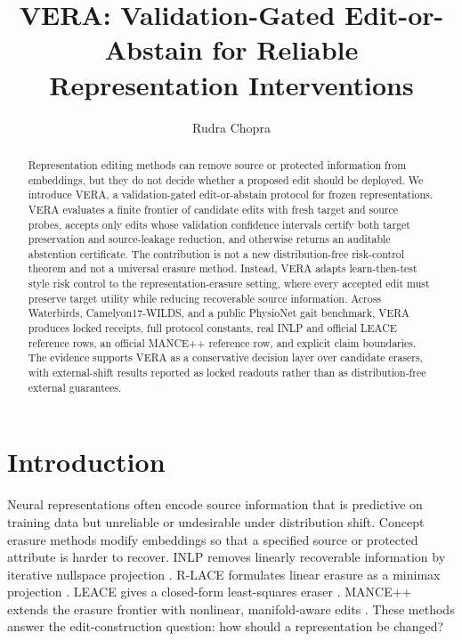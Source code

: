 \documentclass[letterpaper]{article}
\title{VERA: Validation-Gated Edit-or-Abstain for Reliable Representation Interventions}
\author{Rudra Chopra}
\begin{document}
\maketitle

\begin{abstract}
Representation editing methods can remove source or protected information from
embeddings, but they do not decide whether a proposed edit should be deployed.
We introduce VERA, a validation-gated edit-or-abstain protocol for frozen
representations. VERA evaluates a finite frontier of candidate edits with fresh
target and source probes, accepts only edits whose validation confidence
intervals certify both target preservation and source-leakage reduction, and
otherwise returns an auditable abstention certificate. The contribution is not
a new distribution-free risk-control theorem and not a universal erasure
method. Instead, VERA adapts learn-then-test style risk control to the
representation-erasure setting, where every accepted edit must preserve target
utility while reducing recoverable source information. Across Waterbirds,
Camelyon17-WILDS, and a public PhysioNet gait benchmark, VERA produces locked
receipts, full protocol constants, real INLP and official LEACE reference rows,
an official MANCE++ reference row, and explicit claim boundaries. The evidence
supports VERA as a conservative decision layer over candidate erasers, with
external-shift results reported as locked readouts rather than as
distribution-free external guarantees.
\end{abstract}

\section{Introduction}

Neural representations often encode source information that is predictive on
training data but unreliable or undesirable under distribution shift. Concept
erasure methods modify embeddings so that a specified source or protected
attribute is harder to recover. INLP removes linearly recoverable information
by iterative nullspace projection \citep{ravfogel2020inlp}. R-LACE formulates
linear erasure as a minimax projection \citep{ravfogel2022lace}. LEACE gives a
closed-form least-squares eraser \citep{belrose2023leace}. MANCE++ extends
the erasure frontier with nonlinear, manifold-aware edits
\citep{avitan2026mance}. These methods answer the edit-construction question:
how should a representation be changed?
\end{document}
